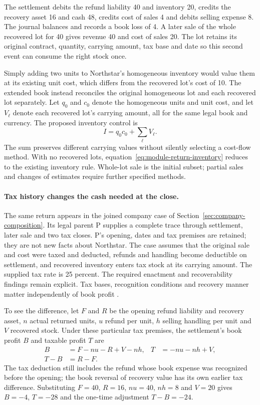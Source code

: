 The settlement debits the refund liability 40 and inventory 20, credits the
recovery asset 16 and cash 48, credits cost of sales 4 and debits selling
expense 8. The journal balances and records a book loss of 4. A later sale
of the whole recovered lot for 40 gives revenue 40 and cost of sales 20.
The lot retains its original contract, quantity, carrying amount, tax base
and date so this second event can consume the right stock once.

Simply adding two units to Northstar's homogeneous inventory would value them
at its existing unit cost, which differs from the recovered lot's cost of 10.
The extended book instead reconciles the original homogeneous lot and each
recovered lot separately. Let $q_0$ and $c_0$ denote the homogeneous units and
unit cost, and let $V_\ell$ denote each recovered lot's carrying amount, all
for the same legal book and currency. The proposed inventory control is
\begin{equation}
 I=q_0c_0+\sum_{\ell}V_\ell.
 \label{eq:module-return-inventory}
\end{equation}
The sum preserves different carrying values without silently selecting a
cost-flow method. With no recovered lots, equation~\eqref{eq:module-return-inventory}
reduces to the existing inventory rule. Whole-lot sale is the initial subset;
partial sales and changes of estimates require further specified methods.

\paragraph{Tax history changes the cash needed at the close.}
The same return appears in the joined company case of
Section~\ref{sec:company-composition}. Its legal parent P supplies a complete
trace through settlement, later sale and two tax closes. P's opening, dates
and tax premises are retained; they are not new facts about Northstar.
The case assumes that the original sale and cost were taxed and deducted,
refunds and handling become deductible on settlement, and recovered inventory
enters tax stock at its carrying amount. The supplied tax rate is 25 percent.
The required enactment and recoverability findings remain explicit. Tax bases,
recognition conditions and recovery manner matter independently of book profit
\citep[IAS~12.7--10,24--25,46--51]{eu20231803}.

To see the difference, let $F$ and $R$ be the opening refund liability and
recovery asset, $n$ actual returned units, $u$ refund per unit, $h$ selling
handling per unit and $V$ recovered stock. Under these particular tax premises,
the settlement's book profit $B$ and taxable profit $T$ are
\begin{align}
 B&=F-nu-R+V-nh, & T&=-nu-nh+V,\\
 T-B&=R-F. &&
 \label{eq:module-return-tax}
\end{align}
The tax deduction still includes the refund whose book expense was recognized
before the opening; the book reversal of recovery value has its own earlier
tax difference. Substituting $F=40$, $R=16$, $nu=40$, $nh=8$ and $V=20$ gives
$B=-4$, $T=-28$ and the one-time adjustment $T-B=-24$.

